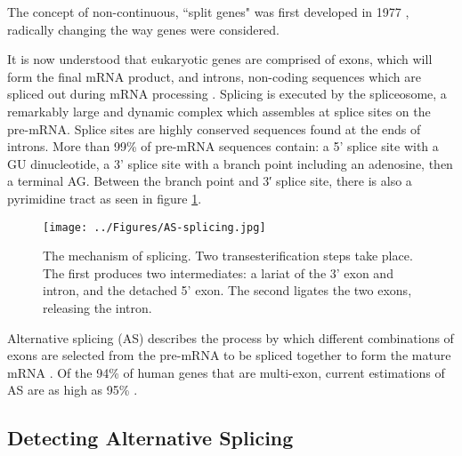 \documentclass[12pt]{article}
\begin{document}
		The concept of non-continuous, ``split genes" was first developed in 1977 \citep{Berget77}, radically changing the way genes were considered. 
			
		It is now understood that eukaryotic genes are comprised of exons, which will form the final mRNA product, and introns, non-coding sequences which are spliced out during mRNA processing \citep{Matlin05}.
		Splicing is executed by the spliceosome, a remarkably large and dynamic complex which assembles at splice sites on the pre-mRNA. 
		Splice sites are highly conserved sequences found at the ends of introns. More than 99\% of pre-mRNA sequences contain: a 5' splice site with a GU dinucleotide, a 3' splice site with a branch point including an adenosine, then a terminal AG.
		Between the branch point and 3′ splice site, there is also a pyrimidine tract \citep{Black03,Vanderfeltz12} as seen in figure \ref{fig:AS-splicing}. 

			\begin{figure}[tb] %
				\centering
				\texttt{[image: ../Figures/AS-splicing.jpg]}
				\caption{The mechanism of splicing. Two transesterification steps take place.
				The first produces two intermediates: a lariat of the 3' exon and intron, and the detached 5' exon.
				The second ligates the two exons, releasing the intron. \citep[Figure sourced:][]{Black03}}
				\label{fig:AS-splicing}
			\end{figure}
		
		Alternative splicing (AS) describes the process by which different combinations of exons are selected from the pre-mRNA to be spliced together to form the mature mRNA \citep{Garcia-Blanco04}. 
		Of the 94\% of human genes that are multi-exon, current estimations of AS are as high as 95\% \citep{Pan08,Wang08}. 
			
		

		
		\subsection{Detecting Alternative Splicing}
		
\end{document}
